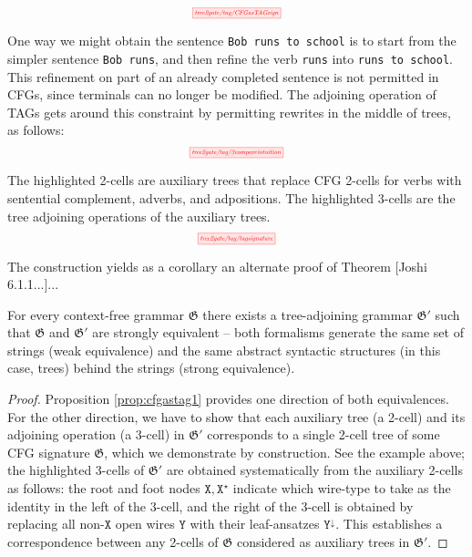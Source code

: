\begin{example}
\[\scalebox{0.5}{\tikzfig{tree2gate/tag/CFGasTAGsign}}\]
\end{example}

\begin{example}
One way we might obtain the sentence \texttt{Bob runs to school} is to start from the simpler sentence \texttt{Bob runs}, and then refine the verb \texttt{runs} into \texttt{runs to school}. This refinement on part of an already completed sentence is not permitted in CFGs, since terminals can no longer be modified. The adjoining operation of TAGs gets around this constraint by permitting rewrites in the middle of trees, as follows:
\[\scalebox{0.5}{\tikzfig{tree2gate/tag/3compareintuition}}\]
\end{example}

\begin{example}
The highlighted 2-cells are auxiliary trees that replace CFG 2-cells for verbs with sentential complement, adverbs, and adpositions. The highlighted 3-cells are the tree adjoining operations of the auxiliary trees.
\[\scalebox{0.5}{\tikzfig{tree2gate/tag/tagsignature}}\]
\end{example}

The construction yields as a corollary an alternate proof of Theorem [Joshi 6.1.1...]...

\begin{corollary}
For every context-free grammar $\mathfrak{G}$ there exists a tree-adjoining grammar $\mathfrak{G}'$ such that $\mathfrak{G}$ and $\mathfrak{G}'$ are strongly equivalent -- both formalisms generate the same set of strings (weak equivalence) and the same abstract syntactic structures (in this case, trees) behind the strings (strong equivalence).
\begin{proof}
Proposition \ref{prop:cfgastag1} provides one direction of both equivalences. For the other direction, we have to show that each auxiliary tree (a 2-cell) and its adjoining operation (a 3-cell) in $\mathfrak{G}'$ corresponds to a single 2-cell tree of some CFG signature $\mathfrak{G}$, which we demonstrate by construction. See the example above; the highlighted 3-cells of $\mathfrak{G}'$ are obtained systematically from the auxiliary 2-cells as follows: the root and foot nodes $\texttt{X},\texttt{X}^\star$ indicate which wire-type to take as the identity in the left of the 3-cell, and the right of the 3-cell is obtained by replacing all non-$\texttt{X}$ open wires $\texttt{Y}$ with their leaf-ansatzes $\texttt{Y}^\downarrow$. This establishes a correspondence between any 2-cells of $\mathfrak{G}$ considered as auxiliary trees in $\mathfrak{G}'$.
\end{proof}
\end{corollary}

